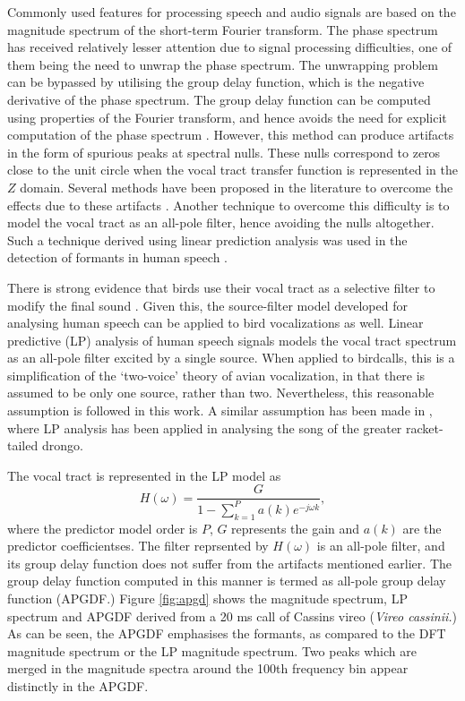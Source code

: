 \documentclass[a4paper]{article}
\begin{document}
Commonly used features for processing speech and audio signals are based on the
magnitude spectrum of the short-term Fourier transform. The phase spectrum has
received relatively lesser attention due to signal processing difficulties, one
of them being the need to unwrap the phase spectrum. The unwrapping problem can be
bypassed by utilising the group delay function, which is the negative derivative
of the phase spectrum. The group delay function can be
computed using properties of the Fourier transform, and hence avoids the need
for explicit computation of the phase spectrum \cite{gdDeriv}. 
However, this method can produce
artifacts in the form of spurious peaks at spectral nulls. These nulls
correspond to zeros close to the unit circle when the vocal tract transfer
function is represented in the $Z$ domain. 
Several methods have been proposed in the literature to overcome the effects due
to these artifacts \cite{modgdf, productSpectrum}. Another technique to overcome
this difficulty is to model the vocal tract as an all-pole filter, hence
avoiding the nulls altogether. Such a
technique derived using linear prediction analysis was used in the detection of
formants in human speech \cite{yegnaFormant}. 


There is strong evidence that birds use their vocal tract as a selective filter
to modify the final sound \cite{catchpole}.  Given this, the source-filter model
developed for analysing human speech can be applied to bird vocalizations as
well.  Linear predictive (LP) analysis of human speech signals models the vocal
tract spectrum as an all-pole filter \cite{makhoul} excited by a single source.
When applied to birdcalls, this is a simplification of the `two-voice' theory of
avian vocalization\cite{catchpoole}, in that there is assumed to be only one
source, rather than two. Nevertheless, this reasonable assumption is followed in
this work. A similar assumption has been made in \cite{agnihotri}, where LP
analysis has been applied in analysing the song of the greater racket-tailed
drongo.

The vocal tract is represented in the LP model as
\begin{equation}
H(\omega) = \frac{G}{1-\sum_{k=1}^{P} a(k) e^{-j \omega k}},
\end{equation}
where the predictor model order is $P$, $G$ represents the gain and $a(k)$ are
the predictor coefficientses\cite{makhoul}.
The filter reprsented by $H(\omega)$ is an all-pole filter, and its group delay
function does not suffer from the artifacts mentioned earlier. The group delay
function computed in this manner is termed as all-pole group delay
function (APGDF.) Figure \ref{fig:apgd} shows the magnitude spectrum, LP
spectrum and APGDF derived from a 20 ms call of Cassins vireo (\textit{Vireo
cassinii.}) As can be seen, the APGDF emphasises the formants, as compared to the
DFT magnitude spectrum or the LP magnitude spectrum. Two peaks which are merged
in the magnitude spectra around the 100th frequency bin appear distinctly in the
APGDF.
\end{document}
